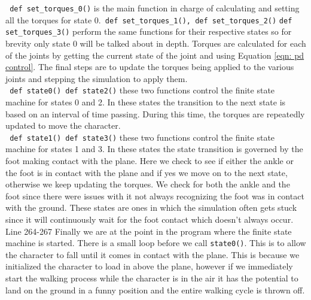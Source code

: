 \documentclass[12pt, a4paper]{article}
\begin{document}
\verb; def set_torques_0(); is the main function in charge of calculating and setting all the torques for state 0.\verb; def set_torques_1(), def set_torques_2(); \verb;def set_torques_3(); perform the same functions for their respective states so for brevity only state 0 will be talked about in depth. Torques are calculated for each of the joints by getting the current state of the joint and using Equation \ref{eqn: pd control}. The final steps are to update the torques being applied to the various joints and stepping the simulation to apply them.\\

\verb; def state0() def state2(); these two functions control the finite state machine for states 0 and 2. In these states the transition to the next state is based on an interval of time passing. During this time, the torques are repeatedly updated to move the character.\\

\verb; def state1() def state3(); these two functions control the finite state machine for states 1 and 3. In these states the state transition is governed by the foot making contact with the plane. Here we check to see if either the ankle or the foot is in contact with the plane and if yes we move on to the next state, otherwise we keep updating the torques. We check for both the ankle and the foot since there were issues with it not always recognizing the foot was in contact with the ground. These states are ones in which the simulation often gets stuck since it will continuously wait for the foot contact which doesn't always occur.\\

Line 264-267 Finally we are at the point in the program where the finite state machine is started. There is a small loop before we call \verb;state0();. This is to allow the character to fall until it comes in contact with the plane. This is because we initialized the character to load in above the plane, however if we immediately start the walking process while the character is in the air it has the potential to land on the ground in a funny position and the entire walking cycle is thrown off.
\end{document}
